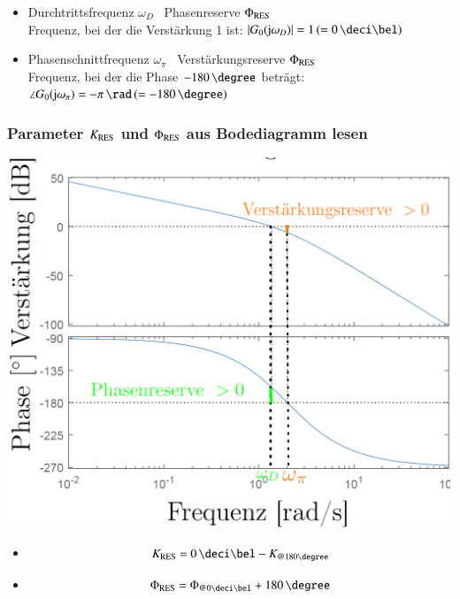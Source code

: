 \begin{itemize}
    \item Durchtrittsfrequenz $\omega_{D}$ \textrightarrow\ Phasenreserve $\Phi_{\rm RES}$ \\
        Frequenz, bei der die Verstärkung 1 ist: $| G_{0}(\jimg \omega_{D})| = 1 \, (= 0 \, \deci \bel)$
    \item Phasenschnittfrequenz $\omega_{\pi}$ \textrightarrow\ Verstärkungsreserve $\Phi_{\rm RES}$ \\
        Frequenz, bei der die Phase $-180 \, \degree$ beträgt: $\angle {G_{0}(\jimg \omega_{\pi})} = - \pi \, \rad \, (= -180 \, \degree)$
\end{itemize}


\subsubsection[Parameter K_{\rm RES} und  \Phi_{\rm RES} aus Bodediagramm lesen]{Parameter $K_{\rm RES}$ und  $\Phi_{\rm RES}$ aus Bodediagramm lesen}

\begin{minipage}[c]{0.55\columnwidth}
    \includegraphics[width=\columnwidth]{images/bodeplot_stabilitaetsreserven.png}
\end{minipage}
\hfill
\begin{minipage}[c]{0.42\columnwidth}
    \raggedright%
    \begin{itemize}
        \item {} 
            $$ K_{\rm RES} = 0 \, \deci \bel - K_{\text{@} 180 \degree } $$ 

        \item {} 
            $$ \Phi_{\rm RES} = \Phi_{\text{@}0 \deci \bel }  + 180 \, \degree $$ 
    \end{itemize}
\end{minipage}


